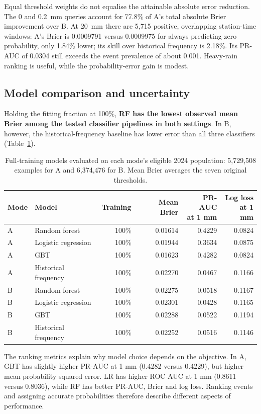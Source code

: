 Equal threshold weights do not equalise the attainable absolute error reduction. The 0 and 0.2~mm queries account for 77.8\% of A's total absolute Brier improvement over B. At 20~mm there are 5,715 positive, overlapping station-time windows: A's Brier is 0.0009791 versus 0.0009975 for always predicting zero probability, only 1.84\% lower; its skill over historical frequency is 2.18\%. Its PR-AUC of 0.0304 still exceeds the event prevalence of about 0.001. Heavy-rain ranking is useful, while the probability-error gain is modest.

\FloatBarrier
\subsection{Model comparison and uncertainty}
Holding the fitting fraction at 100\%, \textbf{RF has the lowest observed mean Brier among the tested classifier pipelines in both settings}. In B, however, the historical-frequency baseline has lower error than all three classifiers (Table~\ref{tab:t2baseline}).
\par
\begin{table}[!ht]\centering\small
\begin{tabular}{llrrrr}\toprule
Mode & Model & Training & Mean Brier & \shortstack{PR-AUC\\at 1 mm} & \shortstack{Log loss\\at 1 mm}\\\midrule
A & Random forest & 100\% & 0.01614 & 0.4229 & 0.0824 \\
A & Logistic regression & 100\% & 0.01944 & 0.3634 & 0.0875 \\
A & GBT & 100\% & 0.01623 & 0.4282 & 0.0824 \\
A & Historical frequency & 100\% & 0.02270 & 0.0467 & 0.1166 \\
B & Random forest & 100\% & 0.02275 & 0.0518 & 0.1167 \\
B & Logistic regression & 100\% & 0.02301 & 0.0428 & 0.1165 \\
B & GBT & 100\% & 0.02288 & 0.0522 & 0.1194 \\
B & Historical frequency & 100\% & 0.02252 & 0.0516 & 0.1146 \\
\bottomrule
\end{tabular}
\caption{Full-training models evaluated on each mode's eligible 2024 population: 5,729,508 examples for A and 6,374,476 for B. Mean Brier averages the seven original thresholds.}\label{tab:t2baseline}
\end{table}
\par
The ranking metrics explain why model choice depends on the objective. In A, GBT has slightly higher PR-AUC at 1 mm (0.4282 versus 0.4229), but higher mean probability squared error. LR has higher ROC-AUC at 1 mm (0.8611 versus 0.8036), while RF has better PR-AUC, Brier and log loss. Ranking events and assigning accurate probabilities therefore describe different aspects of performance.

